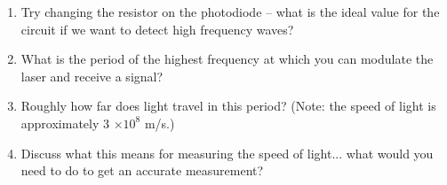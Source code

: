 \documentclass[12pt, letterpaper]{article}
\begin{document}
\begin{enumerate}
	\answergrid{5cm}
	\item Try changing the resistor on the photodiode -- what is the ideal value for the circuit if we want to detect high frequency waves?
	
	\answergrid{5cm}
	\item What is the period of the highest frequency at which you can modulate the laser and receive a signal?
	
		\answergrid{5cm}
	\item Roughly how far does light travel in this period?  (Note: the speed of light is approximately 3 $\times 10^8$ m/s.)
	
		\answergrid{5cm}
	\item Discuss what this means for measuring the speed of light... what would you need to do to get an accurate measurement?
	
		\fillanswergrid
\end{enumerate}



\end{document}
